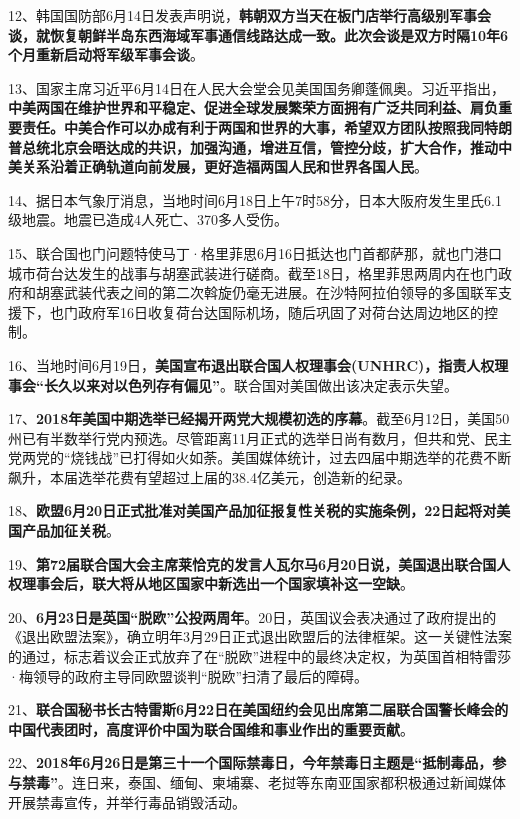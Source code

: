 12、韩国国防部6月14日发表声明说，{\textbf{韩朝双方当天在板门店举行高级别军事会谈，就恢复朝鲜半岛东西海域军事通信线路达成一致。此次会谈是双方时隔10年6个月重新启动将军级军事会谈}}。

13、国家主席习近平6月14日在人民大会堂会见美国国务卿蓬佩奥。习近平指出，{\textbf{中美两国在维护世界和平稳定、促进全球发展繁荣方面拥有广泛共同利益、肩负重要责任。中美合作可以办成有利于两国和世界的大事，希望双方团队按照我同特朗普总统北京会晤达成的共识，加强沟通，增进互信，管控分歧，扩大合作，推动中美关系沿着正确轨道向前发展，更好造福两国人民和世界各国人民}}。

14、据日本气象厅消息，当地时间6月18日上午7时58分，日本大阪府发生里氏6.1级地震。地震已造成4人死亡、370多人受伤。

15、联合国也门问题特使马丁·格里菲思6月16日抵达也门首都萨那，就也门港口城市荷台达发生的战事与胡塞武装进行磋商。截至18日，格里菲思两周内在也门政府和胡塞武装代表之间的第二次斡旋仍毫无进展。在沙特阿拉伯领导的多国联军支援下，也门政府军16日收复荷台达国际机场，随后巩固了对荷台达周边地区的控制。

16、当地时间6月19日，{\textbf{美国宣布退出联合国人权理事会(UNHRC)，指责人权理事会``长久以来对以色列存有偏见''}}。联合国对美国做出该决定表示失望。

17、{\textbf{2018年美国中期选举已经揭开两党大规模初选的序幕}}。截至6月12日，美国50州已有半数举行党内预选。尽管距离11月正式的选举日尚有数月，但共和党、民主党两党的``烧钱战''已打得如火如荼。美国媒体统计，过去四届中期选举的花费不断飙升，本届选举花费有望超过上届的38.4亿美元，创造新的纪录。

18、{\textbf{欧盟6月20日正式批准对美国产品加征报复性关税的实施条例，22日起将对美国产品加征关税}}。

19、{\textbf{第72届联合国大会主席莱恰克的发言人瓦尔马6月20日说，美国退出联合国人权理事会后，联大将从地区国家中新选出一个国家填补这一空缺}}。

20、{\textbf{6月23日是英国``脱欧''公投两周年}}。20日，英国议会表决通过了政府提出的《退出欧盟法案》，确立明年3月29日正式退出欧盟后的法律框架。这一关键性法案的通过，标志着议会正式放弃了在``脱欧''进程中的最终决定权，为英国首相特雷莎·梅领导的政府主导同欧盟谈判``脱欧''扫清了最后的障碍。

21、{\textbf{联合国秘书长古特雷斯6月22日在美国纽约会见出席第二届联合国警长峰会的中国代表团时，高度评价中国为联合国维和事业作出的重要贡献}}。

22、{\textbf{2018年6月26日是第三十一个国际禁毒日，今年禁毒日主题是``抵制毒品，参与禁毒''}}。连日来，泰国、缅甸、柬埔寨、老挝等东南亚国家都积极通过新闻媒体开展禁毒宣传，并举行毒品销毁活动。

